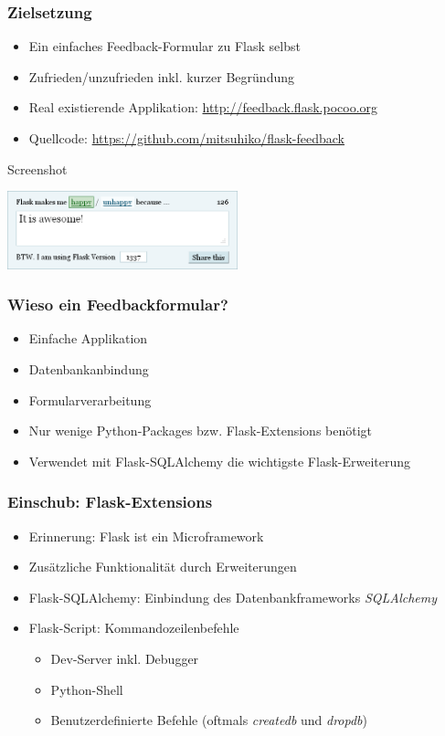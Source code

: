 \documentclass{beamer}
\begin{document}
\begin{frame}
  \frametitle{Zielsetzung}
  \begin{itemize}
    \item Ein einfaches Feedback-Formular zu Flask selbst
    \item Zufrieden/unzufrieden inkl. kurzer Begründung
    \item Real existierende Applikation: \url{http://feedback.flask.pocoo.org}
    \item Quellcode: \url{https://github.com/mitsuhiko/flask-feedback}
  \end{itemize}

  \begin{exampleblock}{Screenshot}
    \begin{center}
      \includegraphics[width=0.5\textwidth]{images/flask-feedback.png}
    \end{center}
  \end{exampleblock}
\end{frame}

\begin{frame}
  \frametitle{Wieso ein Feedbackformular?}
  \begin{itemize}
    \item Einfache Applikation
    \item Datenbankanbindung
    \item Formularverarbeitung
    \item Nur wenige Python-Packages bzw. Flask-Extensions benötigt
    \item Verwendet mit Flask-SQLAlchemy die wichtigste Flask-Erweiterung
  \end{itemize}
\end{frame}

\begin{frame}
  \frametitle{Einschub: Flask-Extensions}
  \begin{itemize}
    \item Erinnerung: Flask ist ein Microframework
    \item Zusätzliche Funktionalität durch Erweiterungen
    \item Flask-SQLAlchemy: Einbindung des Datenbankframeworks \emph{SQLAlchemy}
    \item Flask-Script: Kommandozeilenbefehle
    \begin{itemize}
      \item Dev-Server inkl. Debugger
      \item Python-Shell
      \item Benutzerdefinierte Befehle (oftmals \emph{createdb} und \emph{dropdb})
    \end{itemize}
  \end{itemize}
\end{frame}
\end{document}
